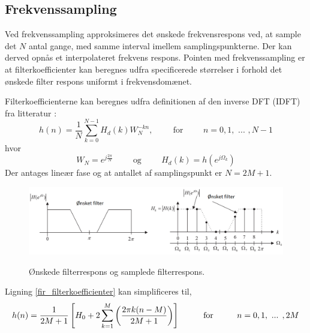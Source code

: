 \subsection{Frekvenssampling}
Ved frekvenssampling approksimeres det ønskede frekvensrespons ved, at sample det $N$ antal gange, med samme interval imellem samplingspunkterne. Der kan derved opnås et interpolateret frekvens respons.
Pointen med frekvenssampling er at filterkoefficienter kan beregnes udfra specificerede størrelser i forhold det ønskede filter respons uniformt i frekvensdomænet.

Filterkoefficienterne kan beregnes udfra definitionen af den inverse DFT (IDFT) fra litteratur \cite[Side. 262]{Tan2013}:
\begin {equation}
h(n)=\frac{1}{N}\sum_{k=0}^{N-1}H_{d}(k)W_{N}^{-kn} ,\hspace{1cm}\text{for}\hspace{1cm} n = 0, 1,\text{ ... }, N-1 \label{fir_filterkoefficienter}
\end {equation}
hvor
\begin {equation}
W_{N}=e^{j\frac{2\pi}{N}} \hspace{1cm}\text{og} \hspace{1cm} H_{d}(k)=h(e^{j\Omega_{k}}) \nonumber
\end {equation}
Der antages lineær fase og at antallet af samplingspunkt er $N=2M+1$.


\begin{figure}[h]
\centering
\includegraphics[width=.90\textwidth]{billeder/fir_frekvenssampling.png}\label{fig:fir_frekvenssampling}
\caption{Ønskede filterrespons og samplede filterrespons.}
\end{figure}
\FloatBlock

Ligning \ref{fir_filterkoefficienter} kan simplificeres til,
\begin {equation}
h(n)=\frac{1}{2M+1}\left[ H_{0}+2\sum_{k=1}^{M} \left( \frac{2\pi k(n-M)}{2M+1} \right) \right] \hspace{1cm} \text{for} \hspace{1 cm} n=0,1,\text{ ... },2M
\end {equation}

